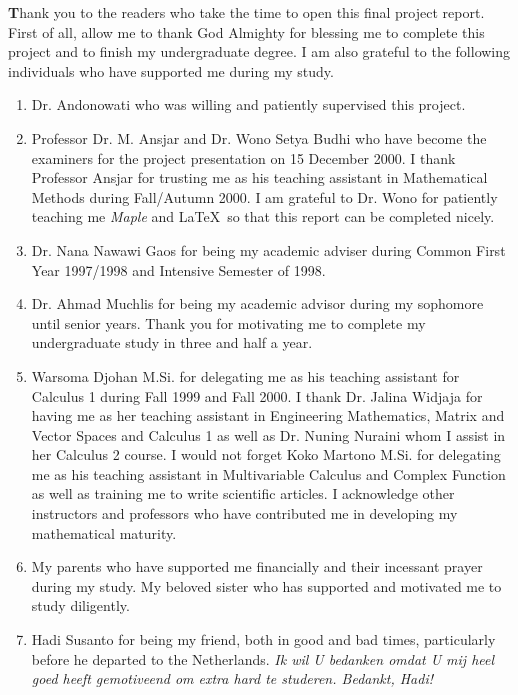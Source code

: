 \documentclass[12pt,a4paper]{report}
\begin{document}
\normalsize {\Huge \textbf{T}}hank you to the readers who take the time to open this final project report. First of all, allow me to thank God Almighty for blessing me to complete this project and to finish my undergraduate degree. I am also grateful to the following individuals who have supported me during my study.
\begin{enumerate}[leftmargin=1.2em]
\item Dr. Andonowati who was willing and patiently supervised this project.

\item Professor Dr. M. Ansjar and Dr. Wono Setya Budhi who have become the examiners for the project presentation on 15 December 2000. 
I thank Professor Ansjar for trusting me as his teaching assistant in Mathematical Methods during Fall/Autumn 2000.
I am grateful to Dr. Wono for patiently teaching me \emph{Maple} and \LaTeX \ so that this report can be completed nicely.

\item Dr. Nana Nawawi Gaos for being my academic adviser during Common First Year 1997/1998 and Intensive Semester of 1998.

\item Dr. Ahmad Muchlis for being my academic advisor during my sophomore until senior years. Thank you for motivating me to complete my undergraduate study in three and half a year.

\item Warsoma Djohan M.Si. for delegating me as his teaching assistant for Calculus 1 during Fall 1999 and Fall 2000.
I thank Dr. Jalina Widjaja for having me as her teaching assistant in Engineering Mathematics, Matrix and Vector Spaces and Calculus 1 as well as Dr. Nuning Nuraini whom I assist in her Calculus 2 course. I would not forget Koko Martono M.Si. for delegating me as his teaching assistant in Multivariable Calculus and Complex Function as well as training me to write scientific articles. I acknowledge other instructors and professors who have contributed me in developing my mathematical maturity.

\item My parents who have supported me financially and their incessant prayer during my study. My beloved sister who has supported and motivated me to study diligently.

\item Hadi Susanto for being my friend, both in good and bad times, particularly before he departed to the Netherlands. \textsl{Ik wil U bedanken omdat U mij heel goed heeft gemotiveend om extra hard te studeren. Bedankt, Hadi!}


\end{enumerate}
\end{document}
